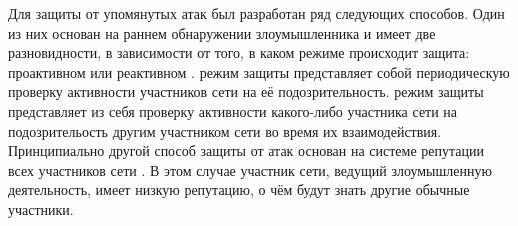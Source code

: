\Sentence
Для защиты от упомянутых атак был разработан ряд следующих способов. 
\Sentence
Один из них основан на раннем обнаружении злоумышленника и имеет две разновидности, в зависимости 
от того, в каком режиме происходит защита: проактивном или реактивном . 
\Sentence
{} режим защиты представляет собой периодическую проверку активности участников сети на её 
подозрительность. 
\Sentence
{} режим защиты представляет из себя проверку активности какого-либо участника 
сети на подозрительость другим участником сети во время их взаимодействия. 
\Sentence
Принципиально другой способ защиты от атак основан на системе репутации всех участников сети 
 .
\Sentence
В этом случае участник сети, ведущий злоумышленную деятельность, имеет низкую репутацию, о чём 
будут знать другие обычные участники. 
